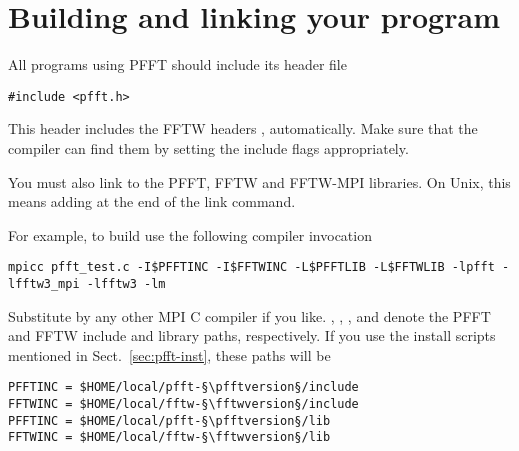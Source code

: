 \section{Building and linking your program}
All programs using PFFT should include its header file
\begin{lstlisting}
#include <pfft.h>
\end{lstlisting}
This header includes the FFTW headers ,  automatically. Make sure that the compiler can find them by setting
the include flags appropriately.

You must also link to the PFFT, FFTW and FFTW-MPI libraries. On Unix, this means adding  at the end of the link command.

For example, to build  use the following compiler invocation
\begin{lstlisting}[prebreak = {\textbackslash}]
mpicc pfft_test.c -I$PFFTINC -I$FFTWINC -L$PFFTLIB -L$FFTWLIB -lpfft -lfftw3_mpi -lfftw3 -lm
\end{lstlisting}
Substitute  by any other MPI C compiler if you like.
, , , and  denote the PFFT and FFTW include and library paths, respectively.
If you use the install scripts mentioned in Sect.~\ref{sec:pfft-inst}, these paths will be
\begin{lstlisting}[escapechar=§,numbers=none]
PFFTINC = $HOME/local/pfft-§\pfftversion§/include
FFTWINC = $HOME/local/fftw-§\fftwversion§/include
PFFTINC = $HOME/local/pfft-§\pfftversion§/lib
FFTWINC = $HOME/local/fftw-§\fftwversion§/lib
\end{lstlisting}


